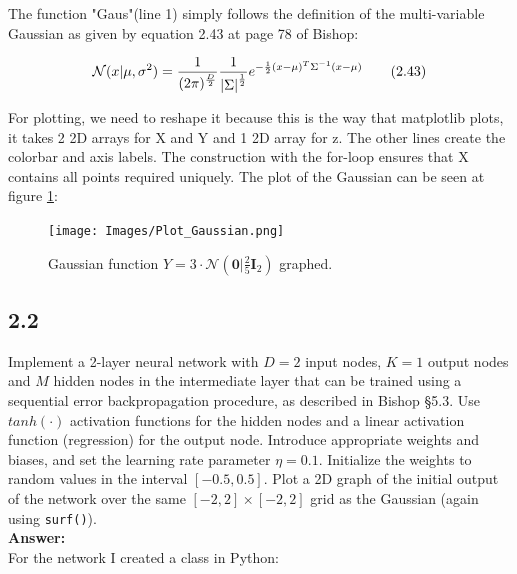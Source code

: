 \documentclass[a4paper]{article}
\begin{document}
The function "Gaus"(line 1) simply follows the definition of the multi-variable Gaussian as given by equation 2.43 at page 78 of Bishop:

\begin{align}
\mathcal N (x|\mu,\sigma^2) = \frac{1}{(2\pi)^{\frac{D}{2}}} \frac{1}{\abs{\Sigma}^{\frac{1}{2}}} e^{-\frac{1}{2}(x-\mu)^T\Sigma^{-1} (x-\mu)}\tag{2.43}
\end{align}

For plotting, we need to reshape it because this is the way that matplotlib plots, it takes 2 2D arrays for X and Y and 1 2D array for z. The other lines create the colorbar and axis labels.
The construction with the for-loop ensures that X contains all points required uniquely.
The plot of the Gaussian can be seen at figure \ref{GausPlot}:

\begin{figure}[H]
\texttt{[image: Images/Plot\_Gaussian.png]}
\caption{Gaussian function $Y = 3 \cdot \mathcal{N}(\textbf{0}|\frac{2}{5}\textbf{I}_2)$ graphed.}
\label{GausPlot}
\end{figure}


\subsection*{2.2}

Implement a 2-layer neural network with $D = 2$ input nodes, $K = 1$ output nodes and $M$ hidden nodes in the intermediate layer that can be trained using a sequential error backpropagation procedure, as described in Bishop §5.3. Use $tanh(\cdot)$ activation functions for the hidden nodes and a linear activation function (regression) for the output node. Introduce appropriate weights and biases, and set the learning rate parameter $\eta = 0.1$. Initialize the weights to random values in the interval $[-0.5,0.5]$. Plot a 2D graph of the initial output of the network over the same $[-2,2] \times [-2,2]$ grid as the Gaussian (again using \texttt{surf()}).\\

\textbf{Answer:}\\

For the network I created a class in Python:
\end{document}

